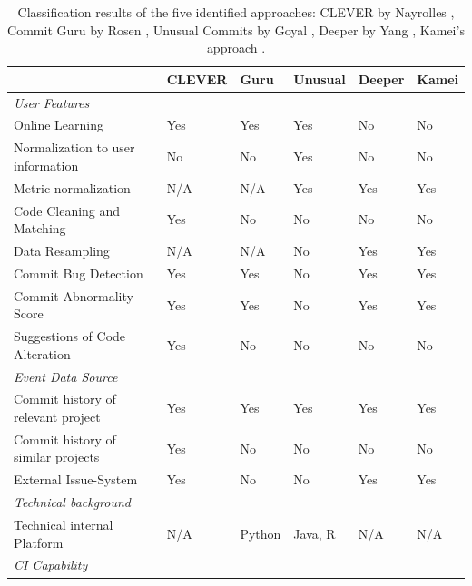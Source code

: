 \begin{table}[t]
	\centering
	\caption{Classification results of the five identified approaches: CLEVER by Nayrolles \cite{Nayrolles2018}, Commit Guru by Rosen \cite{Rosen2015}, Unusual Commits by Goyal \cite{Goyal2017}, Deeper by Yang \cite{Yang2015}, Kamei's approach \cite{Kamei2013}.}
	\begin{tabular}{@{}llllll@{}}
		\toprule
		& CLEVER     & Guru   & Unusual & Deeper & Kamei \\ \midrule
		\textit{User Features}             &            &        &         &        &       \\ 
		Online Learning                    & Yes        & Yes    & Yes     & No     & No    \\
		Normalization to user information  & No         & No     & Yes     & No     & No    \\
		Metric normalization               & N/A        & N/A    & Yes     & Yes    & Yes   \\
		Code Cleaning and Matching         & Yes        & No     & No      & No     & No    \\
		Data Resampling                    & N/A        & N/A    & No      & Yes    & Yes   \\
		Commit Bug Detection               & Yes        & Yes    & No      & Yes    & Yes   \\
		Commit Abnormality Score           & Yes        & Yes    & No      & Yes    & Yes   \\
		Suggestions of Code Alteration     & Yes        & No     & No      & No     & No    \\ \midrule
		\textit{Event Data Source}         &            &        &         &        &       \\ 
		Commit history of relevant project & Yes        & Yes    & Yes     & Yes    & Yes   \\
		Commit history of similar projects & Yes        & No     & No      & No     & No    \\
		External Issue-System              & Yes        & No     & No      & Yes    & Yes   \\ \midrule
		\textit{Technical background}      &            &        &         &        &       \\ 
		Technical internal Platform        & N/A        & Python & Java, R & N/A    & N/A   \\ \midrule
		\textit{CI Capability}             &            &        &         &        &       \\ 

\end{tabular}
\end{table}
